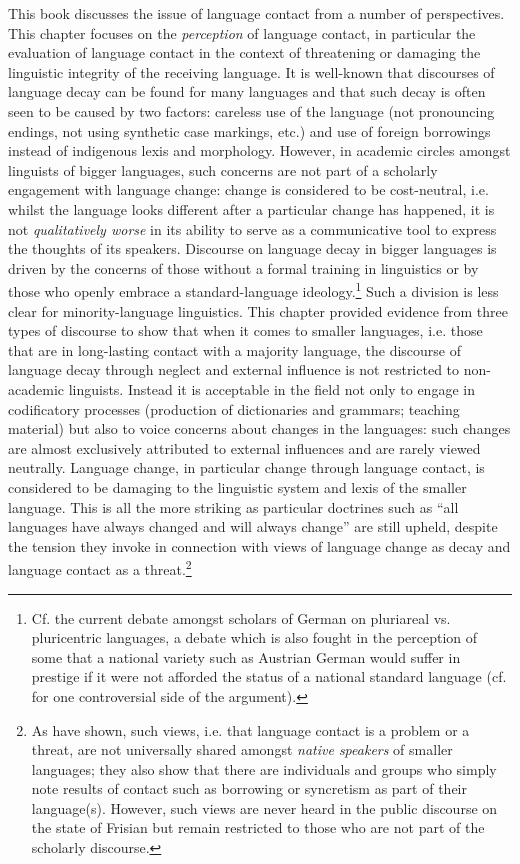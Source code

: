 \documentclass[output=paper]{langsci/langscibook}
\begin{document}
This book discusses the issue of language contact from a number of perspectives. This chapter focuses on the \textit{perception} of language contact, in particular the evaluation of language contact in the context of threatening or damaging the linguistic integrity of the receiving language. It is well-known that discourses of language decay can be found for many languages and that such decay is often seen to be caused by two factors: careless use of the language (not pronouncing endings, not using synthetic case markings, etc.) and use of foreign borrowings instead of indigenous lexis and morphology. However, in academic circles amongst linguists of bigger languages, such concerns are not part of a scholarly engagement with language change: change is considered to be cost-neutral, i.e. whilst the language looks different after a particular change has happened, it is not \textit{qualitatively worse} in its ability to serve as a communicative tool to express the thoughts of its speakers. Discourse on language decay in bigger languages is driven by the concerns of those without a formal training in linguistics or by those who openly embrace a standard-language ideology.\footnote{Cf. the current debate amongst scholars of German on pluriareal vs. pluricentric languages, a debate which is also fought in the perception of some that a national variety such as Austrian German would suffer in prestige if it were not afforded the status of a national standard language (cf. \citealt{Dollinger2019} for one controversial side of the argument).} Such a division is less clear for minority-language linguistics. This chapter provided evidence from three types of discourse to show that when it comes to smaller languages, i.e. those that are in long-lasting contact with a majority language, the discourse of language decay through neglect and external influence is not restricted to non-academic linguists. Instead it is acceptable in the field not only to engage in codificatory processes (production of dictionaries and grammars; teaching material) but also to voice concerns about changes in the languages: such changes are almost exclusively attributed to external influences and are rarely viewed neutrally. Language change, in particular change through language contact, is considered to be damaging to the linguistic system and lexis of the smaller language. This is all the more striking as particular doctrines such as “all languages have always changed and will always change” are still upheld, despite the tension they invoke in connection with views of language change as decay and language contact as a threat.\footnote{As \citet{AdmiraalEtAl2019} have shown, such views, i.e. that language contact is a problem or a threat, are not universally shared amongst \textit{native speakers} of smaller languages; they also show that there are individuals and groups who simply note results of contact such as borrowing or syncretism as part of their language(s). However, such views are never heard in the public discourse on the state of Frisian but remain restricted to those who are not part of the scholarly discourse.}
\end{document}
